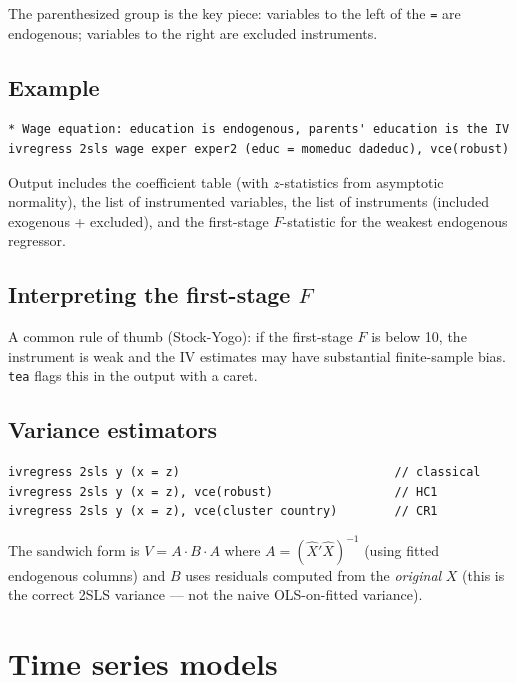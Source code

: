 \documentclass[11pt,letterpaper]{article}
\begin{document}
The parenthesized group is the key piece: variables to the left of
the \texttt{=} are endogenous; variables to the right are excluded
instruments.

\subsection{Example}

\begin{lstlisting}
* Wage equation: education is endogenous, parents' education is the IV
ivregress 2sls wage exper exper2 (educ = momeduc dadeduc), vce(robust)
\end{lstlisting}

Output includes the coefficient table (with $z$-statistics from
asymptotic normality), the list of instrumented variables, the list
of instruments (included exogenous + excluded), and the first-stage
$F$-statistic for the weakest endogenous regressor.

\subsection{Interpreting the first-stage $F$}

A common rule of thumb (Stock-Yogo): if the first-stage $F$ is below
10, the instrument is weak and the IV estimates may have substantial
finite-sample bias.  \texttt{tea} flags this in the output with a
caret.

\subsection{Variance estimators}

\begin{lstlisting}
ivregress 2sls y (x = z)                              // classical
ivregress 2sls y (x = z), vce(robust)                 // HC1
ivregress 2sls y (x = z), vce(cluster country)        // CR1
\end{lstlisting}

The sandwich form is $V = A \cdot B \cdot A$ where $A = (\hat X'\hat X)^{-1}$
(using fitted endogenous columns) and $B$ uses residuals computed from
the \emph{original} $X$ (this is the correct 2SLS variance — not the
naive OLS-on-fitted variance).

\section{Time series models}\label{sec:tsmodels}
\end{document}
